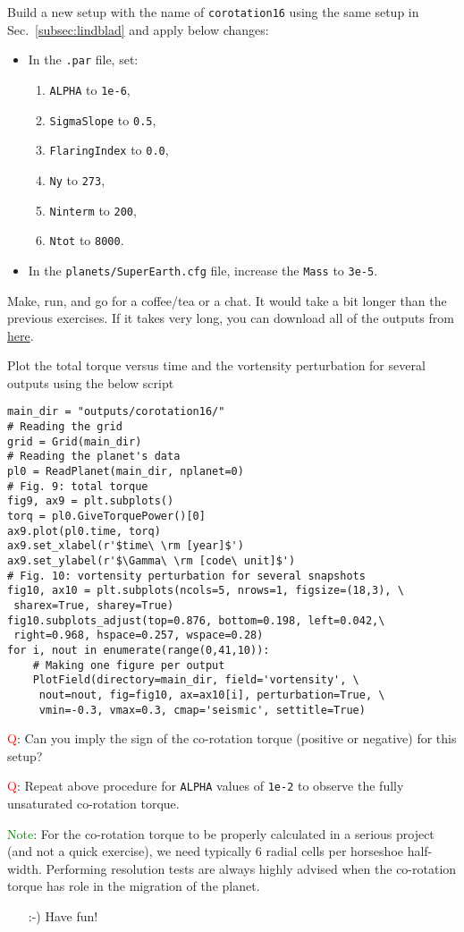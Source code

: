 \documentclass[14pt]{scrartcl}
\begin{document}
Build a new setup with the name of \texttt{corotation16} using the same setup in Sec.~\ref{subsec:lindblad} and apply below changes:  
\begin{itemize}
	\item In the \texttt{.par} file, set:
	\begin{enumerate}
		\item \texttt{ALPHA} to \texttt{1e-6},
		\item \texttt{SigmaSlope} to \texttt{0.5},
		\item \texttt{FlaringIndex} to \texttt{0.0},
		\item \texttt{Ny} to \texttt{273},
		\item \texttt{Ninterm} to \texttt{200},
		\item \texttt{Ntot} to \texttt{8000}. 	
	\end{enumerate}
	\item In the \texttt{planets/SuperEarth.cfg} file, increase the \texttt{Mass} to \texttt{3e-5}.
\end{itemize}

Make, run, and go for a coffee/tea or a chat. It would take a bit longer than the previous exercises. If it takes very long, you can download all of the outputs from \href{https://fumdrive.um.ac.ir/index.php/s/ac6t3bdYtZZqjTi}{here}.

Plot the total torque versus time and the vortensity perturbation for several outputs using the below script

\begin{verbatim}
main_dir = "outputs/corotation16/"
# Reading the grid
grid = Grid(main_dir)
# Reading the planet's data
pl0 = ReadPlanet(main_dir, nplanet=0)
# Fig. 9: total torque
fig9, ax9 = plt.subplots()
torq = pl0.GiveTorquePower()[0]
ax9.plot(pl0.time, torq)
ax9.set_xlabel(r'$time\ \rm [year]$')
ax9.set_ylabel(r'$\Gamma\ \rm [code\ unit]$')
# Fig. 10: vortensity perturbation for several snapshots
fig10, ax10 = plt.subplots(ncols=5, nrows=1, figsize=(18,3), \
 sharex=True, sharey=True)
fig10.subplots_adjust(top=0.876, bottom=0.198, left=0.042,\
 right=0.968, hspace=0.257, wspace=0.28)
for i, nout in enumerate(range(0,41,10)):
    # Making one figure per output
    PlotField(directory=main_dir, field='vortensity', \
     nout=nout, fig=fig10, ax=ax10[i], perturbation=True, \
     vmin=-0.3, vmax=0.3, cmap='seismic', settitle=True)
\end{verbatim}

\textcolor{red}{Q}: Can you imply the sign of the co-rotation torque (positive or negative) for this setup?

\textcolor{red}{Q}: Repeat above procedure for \texttt{ALPHA} values of \texttt{1e-2} to observe the fully unsaturated co-rotation torque.

\textcolor{green}{Note}: For the co-rotation torque to be properly calculated in a serious project (and not a quick exercise), we need typically 6 radial cells per horseshoe half-width. Performing resolution tests are always highly advised when the co-rotation torque has role in the migration of the planet.

\begin{itemize}
\item[:-)] Have fun!
\end{itemize}
\end{document}
